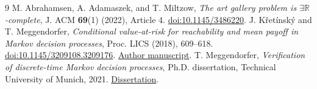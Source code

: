 \documentclass[11pt,a4paper]{amsart}
\newcommand{\RR}{\exists\mathbb R}
\begin{document}
\begin{thebibliography}{9}
M. Abrahamsen, A. Adamaszek, and T. Miltzow, \emph{The art gallery problem is \(\RR\)-complete}, J. ACM \textbf{69}(1) (2022), Article 4. \href{https://doi.org/10.1145/3486220}{doi:10.1145/3486220}.
J. K\v{r}et\'insk\'y and T. Meggendorfer, \emph{Conditional value-at-risk for reachability and mean payoff in Markov decision processes}, Proc. LICS (2018), 609--618. \href{https://doi.org/10.1145/3209108.3209176}{doi:10.1145/3209108.3209176}. \href{https://arxiv.org/html/1805.02946v1}{Author manuscript}.
T. Meggendorfer, \emph{Verification of discrete-time Markov decision processes}, Ph.D. dissertation, Technical University of Munich, 2021. \href{https://mediatum.ub.tum.de/doc/1550256/1550256.pdf}{Dissertation}.
\end{thebibliography}
\end{document}
